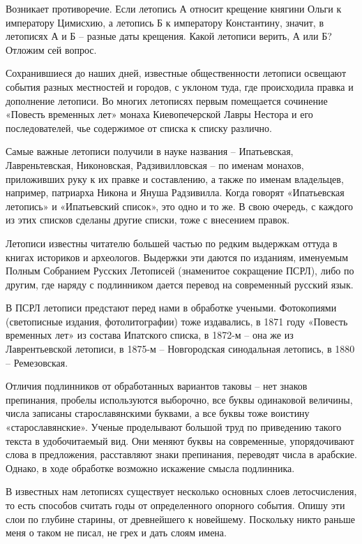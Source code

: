 Возникает противоречие. Если летопись А относит крещение княгини Ольги к императору Цимисхию, а летопись Б к императору Константину, значит, в летописях А и Б – разные даты крещения. Какой летописи верить, А или Б? Отложим сей вопрос.

Сохранившиеся до наших дней, известные общественности летописи освещают события разных местностей и городов, с уклоном туда, где происходила правка и дополнение летописи. Во многих летописях первым помещается сочинение «Повесть временных лет» монаха Киевопечерской Лавры Нестора и его последователей, чье содержимое от списка к списку различно.

Самые важные летописи получили в науке названия – Ипатьевская, Лавреньтевская, Никоновская, Радзивилловская – по именам монахов, приложивших руку к их правке и составлению, а также по именам владельцев, например, патриарха Никона и Януша Радзивилла. Когда говорят «Ипатьевская летопись» и «Ипатьевский список», это одно и то же. В свою очередь, с каждого из этих списков сделаны другие списки, тоже с внесением правок.

Летописи известны читателю большей частью по редким выдержкам оттуда в книгах историков и археологов. Выдержки эти даются по изданиям, именуемым Полным Собранием Русских Летописей (знаменитое сокращение ПСРЛ), либо по другим, где наряду с подлинником дается перевод на современный русский язык.

В ПСРЛ летописи предстают перед нами в обработке учеными. Фотокопиями (светописные издания, фотолитографии) тоже издавались, в 1871 году «Повесть временных лет» из состава Ипатского списка, в 1872-м – она же из Лаврентьевской летописи, в 1875-м – Новгородская синодальная летопись, в 1880 – Ремезовская.

Отличия подлинников от обработанных вариантов таковы – нет знаков препинания, пробелы используются выборочно, все буквы одинаковой величины, числа записаны старославянскими буквами, а все буквы тоже воистину «старославянские». Ученые проделывают большой труд по приведению такого текста в удобочитаемый вид. Они меняют буквы на современные, упорядочивают слова в предложения, расставляют знаки препинания, переводят  числа в арабские. Однако, в ходе обработке возможно искажение смысла подлинника.

В известных нам летописях существует несколько основных слоев летосчисления, то есть способов считать годы от определенного опорного события. Опишу эти слои по глубине старины, от древнейшего к новейшему. Поскольку никто раньше меня о таком не писал, не грех и дать слоям имена.

